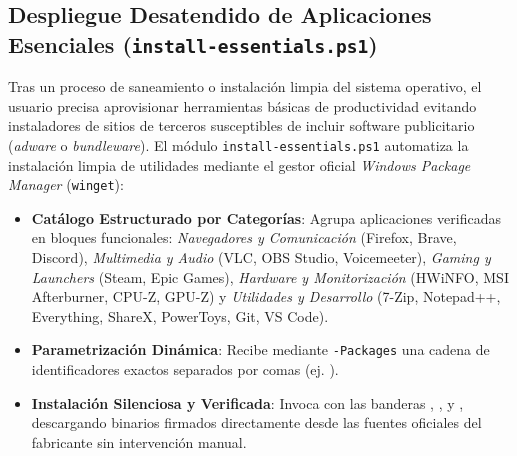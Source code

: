 \documentclass[12pt,a4paper]{report}
\begin{document}
\subsection{Despliegue Desatendido de Aplicaciones Esenciales (\texttt{install-essentials.ps1})}
Tras un proceso de saneamiento o instalación limpia del sistema operativo, el usuario precisa aprovisionar herramientas básicas de productividad evitando instaladores de sitios de terceros susceptibles de incluir software publicitario (\textit{adware} o \textit{bundleware}). El módulo \texttt{install-essentials.ps1} automatiza la instalación limpia de utilidades mediante el gestor oficial \textit{Windows Package Manager} (\texttt{winget}):
\begin{itemize}
    \item \textbf{Catálogo Estructurado por Categorías}: Agrupa aplicaciones verificadas en bloques funcionales: \textit{Navegadores y Comunicación} (Firefox, Brave, Discord), \textit{Multimedia y Audio} (VLC, OBS Studio, Voicemeeter), \textit{Gaming y Launchers} (Steam, Epic Games), \textit{Hardware y Monitorización} (HWiNFO, MSI Afterburner, CPU-Z, GPU-Z) y \textit{Utilidades y Desarrollo} (7-Zip, Notepad++, Everything, ShareX, PowerToys, Git, VS Code).
    \item \textbf{Parametrización Dinámica}: Recibe mediante \texttt{-Packages} una cadena de identificadores exactos separados por comas (ej. ).
    \item \textbf{Instalación Silenciosa y Verificada}: Invoca  con las banderas , ,  y , descargando binarios firmados directamente desde las fuentes oficiales del fabricante sin intervención manual.
\end{itemize}
\end{document}
